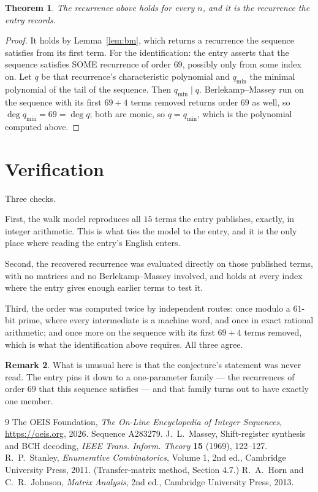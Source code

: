 \documentclass[11pt,a4paper]{article}
\theoremstyle{plain}
\newtheorem{theorem}{Theorem}
\theoremstyle{definition}
\newtheorem{remark}[theorem]{Remark}
\begin{document}
\begin{theorem}
The recurrence above holds for every $n$, and it is the recurrence the entry records.
\end{theorem}

\begin{proof}
It holds by Lemma~\ref{lem:bm}, which returns a recurrence the sequence satisfies from its
first term. For the identification: the entry asserts that the sequence satisfies SOME
recurrence of order $69$, possibly only from some index on. Let $q$ be that recurrence's
characteristic polynomial and $q_{\min}$ the minimal polynomial of the tail of the sequence.
Then $q_{\min}\mid q$. Berlekamp--Massey run on the sequence with its first $69+4$ terms
removed returns order $69$ as well, so $\deg q_{\min}=69=\deg q$; both are monic, so
$q=q_{\min}$, which is the polynomial computed above.
\end{proof}

\section{Verification}

Three checks.

First, the walk model reproduces all $15$ terms the entry publishes, exactly, in integer
arithmetic. This is what ties the model to the entry, and it is the only place where reading
the entry's English enters.

Second, the recovered recurrence was evaluated directly on those published terms, with no
matrices and no Berlekamp--Massey involved, and holds at every index where the entry gives
enough earlier terms to test it.

Third, the order was computed twice by independent routes: once modulo a $61$-bit prime, where
every intermediate is a machine word, and once in exact rational arithmetic; and once more on
the sequence with its first $69+4$ terms removed, which is what the identification above
requires. All three agree.

\begin{remark}
What is unusual here is that the conjecture's statement was never read. The entry pins it down
to a one-parameter family --- the recurrences of order $69$ that this sequence satisfies
--- and that family turns out to have exactly one member.
\end{remark}

\begin{thebibliography}{9}
 The OEIS Foundation, \emph{The On-Line Encyclopedia of Integer
Sequences}, \url{https://oeis.org}, 2026. Sequence A283279.
 J.~L.~Massey, Shift-register synthesis and BCH decoding, \emph{IEEE
Trans. Inform. Theory} \textbf{15} (1969), 122--127.
 R.~P.~Stanley, \emph{Enumerative Combinatorics}, Volume 1, 2nd ed.,
Cambridge University Press, 2011. (Transfer-matrix method, Section 4.7.)
 R.~A.~Horn and C.~R.~Johnson, \emph{Matrix Analysis}, 2nd ed., Cambridge
University Press, 2013.
\end{thebibliography}
\end{document}
